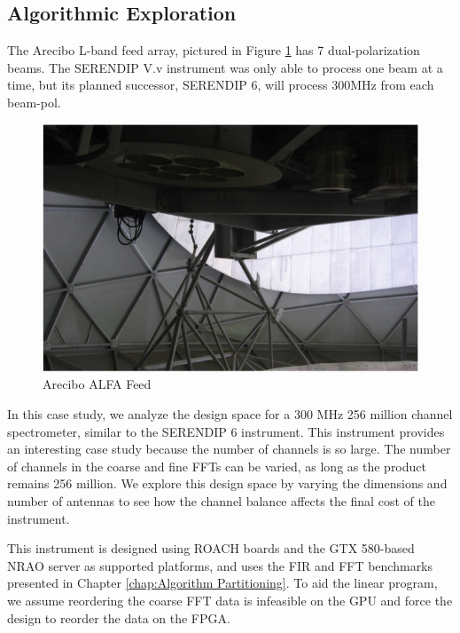 
\subsection{Algorithmic Exploration}

The Arecibo L-band feed array, pictured in Figure \ref{fig: C3/alfa_feed.png} has 7 dual-polarization beams. 
The SERENDIP V.v instrument was only able to process one beam at a time, but its planned successor, SERENDIP 6, will process 300MHz from each beam-pol.

\begin{figure}[ht!]
  \centering
    \includegraphics[width=\textwidth]{Images/C3/alfa_feed.png}
  \caption{Arecibo ALFA Feed}
  \label{fig: C3/alfa_feed.png}
\end{figure}

In this case study, we analyze the design space for a 300 MHz 256 million channel spectrometer, similar to the SERENDIP 6 instrument.
This instrument provides an interesting case study because the number of channels is so large.
The number of channels in the coarse and fine FFTs can be varied, as long as the product remains 256 million.
We explore this design space by varying the dimensions and number of antennas to see how the channel balance affects the final cost of the instrument.

This instrument is designed using ROACH boards and the GTX 580-based NRAO server as supported platforms, and uses the FIR and FFT benchmarks presented in Chapter \ref{chap:Algorithm Partitioning}.
To aid the linear program, we assume reordering the coarse FFT data is infeasible on the GPU and force the design to reorder the data on the FPGA.


